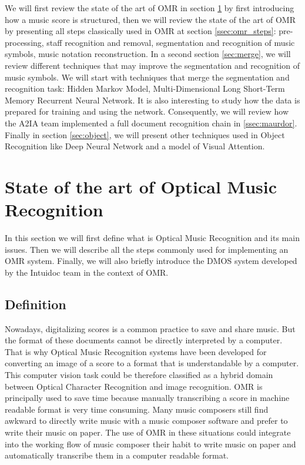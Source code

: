 \documentclass[11pt]{sdm}
\begin{document}
We will first review the state of the art of OMR in section \ref{sec:soa_OMR} by first introducing how a music score is structured, then we will review the state of the art of OMR by presenting all steps classically used in OMR at section \ref{ssec:omr_steps}: pre-processing, staff recognition and removal, segmentation and recognition of music symbols, music notation reconstruction.
In a second section \ref{sec:merge}, we will review different techniques that may improve the segmentation and recognition of music symbols.
We will start with techniques that merge the segmentation and recognition task: Hidden Markov Model, Multi-Dimensional Long Short-Term Memory Recurrent Neural Network.
It is also interesting to study how the data is prepared for training and using the network.
Consequently, we will review how the A2IA team implemented a full document recognition chain in \ref{ssec:maurdor}.
Finally in section \ref{sec:object}, we will present other techniques used in Object Recognition like Deep Neural Network and a model of Visual Attention.

\section{State of the art of Optical Music Recognition} \label{sec:soa_OMR}

In this section we will first define what is Optical Music Recognition and its main issues.
Then we will describe all the steps commonly used for implementing an OMR system.
Finally, we will also briefly introduce the DMOS system developed by the Intuidoc team in the context of OMR.

\subsection{Definition}

Nowadays, digitalizing scores is a common practice to save and share music.
But the format of these documents cannot be directly interpreted by a computer.
That is why Optical Music Recognition systems have been developed for converting an image of a score to a format that is understandable by a computer.
This computer vision task could be therefore classified as a hybrid domain between Optical Character Recognition and image recognition.
OMR is principally used to save time because manually transcribing a score in machine readable format is very time consuming.
Many music composers still find awkward to directly write music with a music composer software and prefer to write their music on paper.
The use of OMR in these situations could integrate into the working flow of music composer their habit to write music on paper and automatically transcribe them in a computer readable format.
\end{document}
